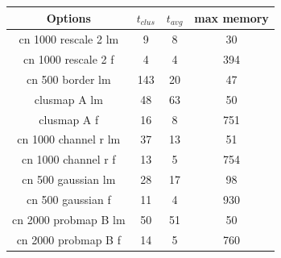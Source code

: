 \documentclass[15pt]{article}
\begin{document}
\bigskip
\bigskip
\centering
\begin{tabular}{c | c | c | c}
\textbf{Options} & $t_{clus}$ & $t_{avg}$ & max memory\\
\hline
cn 1000 rescale 2 lm & 9 & 8 & 30\\
cn 1000 rescale 2 f & 4 & 4 & 394\\
\hline
cn 500 border lm & 143 & 20 & 47\\
\hline
clusmap A lm & 48 & 63 & 50\\
clusmap A f & 16 & 8 & 751\\
\hline
cn 1000 channel r lm & 37 & 13 & 51\\
cn 1000 channel r f & 13 & 5 & 754\\
\hline
cn 500 gaussian lm & 28 & 17 & 98\\
cn 500 gaussian f & 11 & 4 & 930\\
\hline
cn 2000 probmap B lm & 50 & 51 & 50\\
cn 2000 probmap B f & 14 & 5 & 760\\
\end{tabular}
\newpage
\end{document}
